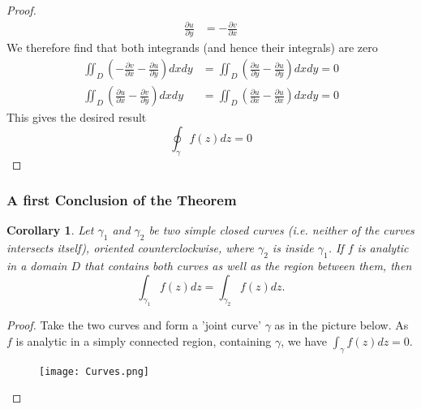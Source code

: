 \documentclass{article}
\newtheorem{corollary}{Corollary}[theorem]
\begin{document}
\begin{proof}
\begin{align*}
\frac{\partial u}{\partial y} &= -\frac{\partial v}{\partial x}
\end{align*}
We therefore find that both integrands (and hence their integrals) are zero
\begin{align*}
\iint_D (-\frac{\partial v}{\partial x} - \frac{\partial u}{\partial y}) dx dy &= \iint_D (\frac{\partial u}{\partial y} - \frac{\partial u}{\partial y}) dx dy = 0 \\
\iint_D (\frac{\partial u}{\partial x} - \frac{\partial v}{\partial y}) dx dy &= \iint_D (\frac{\partial u}{\partial x} - \frac{\partial u}{\partial x}) dx dy = 0
\end{align*}
This gives the desired result
\begin{equation*}
\oint_{\gamma} f(z)dz = 0
\end{equation*}
\end{proof}

\subsubsection{A first Conclusion of the Theorem}
\begin{corollary}
Let $\gamma_1$ and $\gamma_2$ be two simple closed curves (i.e. neither of the curves intersects itself), oriented counterclockwise, where $\gamma_2$ is inside $\gamma_1$. If $f$ is analytic in a domain $D$ that contains both curves as well as the region between them, then
\begin{equation*}
\int_{\gamma_1}f(z)dz = \int_{\gamma_2}f(z)dz.
\end{equation*}
\end{corollary}
\begin{proof}
Take the two curves and form a 'joint curve' $\gamma$ as in the picture below. As $f$ is analytic in a simply connected region, containing $\gamma$, we have $\int_{\gamma}f(z)dz = 0$.
\begin{figure}[h]
\centering
\texttt{[image: Curves.png]}
\end{figure}
\end{proof}
\end{document}

